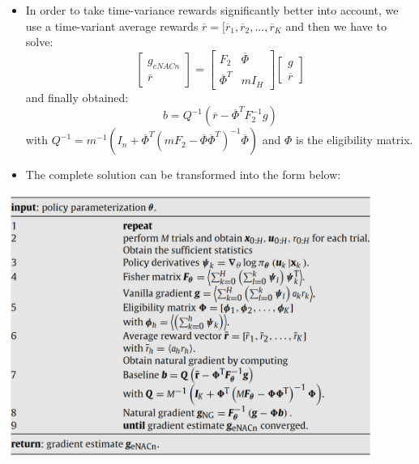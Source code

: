 {\begin{pcolumn}
{\begin{itemize}
	\item In order to take time-variance rewards significantly better into account, we use a time-variant average rewards $\overline r = [\overline r_1, \overline r_2, ..., \overline r_K$ and then we have to solve:  \vspace{-2mm}
\begin{equation}
\left[
	\begin{matrix}
		g_{eNACn} \\
		\overline r
	\end{matrix}
	\right] = 
\left[
	\begin{matrix}
		F_2 & \overline \Phi \\
		\overline \Phi^T & mI_H
	\end{matrix}
	\right]
\left[
	\begin{matrix}
		g \\
		\overline r
	\end{matrix}
	\right]
\end{equation}
and finally obtained:
\begin{equation}
	b = Q^{-1}(\overline r - \overline \Phi^T F_2^{-1}g)
\end{equation}
with $Q^{-1} = m^{-1}(I_n + \overline\Phi^T(mF_2-\overline\Phi\overline\Phi^T)^{-1}\overline\Phi)$ and $\Phi$ is the eligibility matrix. 
	\item The complete solution can be transformed into the form below:
\end{itemize}
\begin{center}
	\includegraphics[width=0.9\textwidth]{img/algorithm.png}
	\vspace*{-13mm}
\end{center}
\vspace*{-2mm}
}

\end{pcolumn}
}



\makeposter

